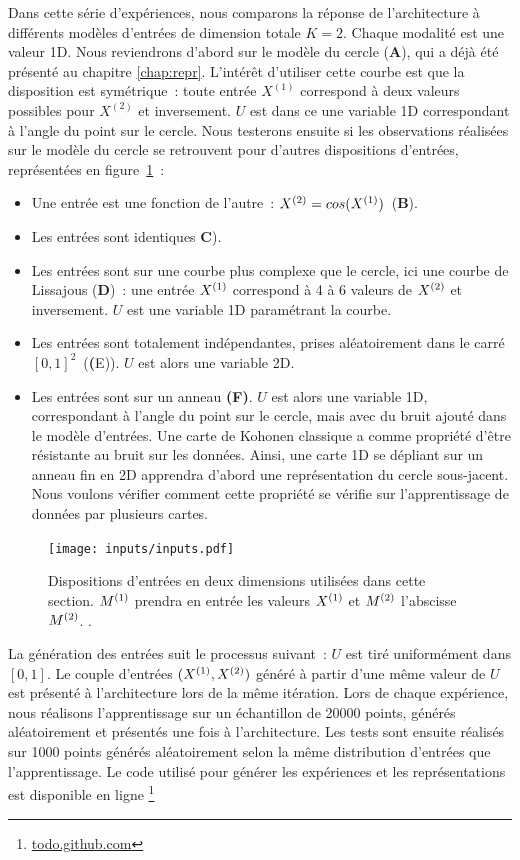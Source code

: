 \documentclass[../main]{subfiles}
\begin{document}
Dans cette série d'expériences, nous comparons la réponse de l'architecture à différents modèles d'entrées de dimension totale $K=2$. Chaque modalité est une valeur 1D.
Nous reviendrons d'abord sur le modèle du cercle (\textbf{A}), qui a déjà été présenté au chapitre \ref{chap:repr}. L'intérêt d'utiliser cette courbe est que la disposition est symétrique~: toute entrée $X^{(1)}$ correspond à deux valeurs possibles pour $X^{(2)}$ et inversement. $U$ est dans ce une variable 1D correspondant à l'angle du point sur le cercle.
Nous testerons ensuite si les observations réalisées sur le modèle du cercle se retrouvent pour d'autres dispositions d'entrées, représentées en figure~\ref{fig:input_list}~:
\begin{itemize}
	\item Une entrée est une fonction de l'autre~: $X^{({2})} = cos(X^{({1})})$~(\textbf{B}).
	\item Les entrées sont identiques \textbf{C}).
	\item Les entrées sont sur une courbe plus complexe que le cercle, ici une courbe de Lissajous (\textbf{D})~: une entrée $X^{({1})}$ correspond à 4 à 6 valeurs de $X^{({2})}$ et inversement. $U$ est une variable 1D paramétrant la courbe.
	\item Les entrées sont totalement indépendantes, prises aléatoirement dans le carré $[0,1]^2$~(\textbf({E})). $U$ est alors une variable 2D.
	\item Les entrées sont sur un anneau \textbf{(F)}. $U$ est alors une variable 1D, correspondant à l'angle du point sur le cercle, mais avec du bruit ajouté dans le modèle d'entrées. 
	Une carte de Kohonen classique a comme propriété d'être résistante au bruit sur les données. Ainsi, une carte 1D se dépliant sur un anneau fin en 2D apprendra d'abord une représentation du cercle sous-jacent. Nous voulons vérifier comment cette propriété se vérifie sur l'apprentissage de données par plusieurs cartes.
\end{itemize}

\begin{figure}[h!]
	\texttt{[image: inputs/inputs.pdf]}
	\caption{Dispositions d'entrées en deux dimensions utilisées dans cette section. $M^{({1})}$ prendra en entrée les valeurs $X^{({1})}$ et $M^{({2})}$ l'abscisse $M^{({2})}$. \label{fig:input_list}.}
\end{figure}

La génération des entrées suit le processus suivant~: $U$ est tiré uniformément dans $[0,1]$. Le couple d'entrées $(X^{({1})},X^{({2})})$ généré à partir d'une même valeur de $U$ est présenté à l'architecture lors de la même itération.
Lors de chaque expérience, nous réalisons l'apprentissage sur un échantillon de 20000 points, générés aléatoirement et présentés une fois à l'architecture. 
Les tests sont ensuite réalisés sur 1000 points générés aléatoirement selon la même distribution d'entrées que l'apprentissage.
Le code utilisé pour générer les expériences et les représentations est disponible en ligne \footnote{\url{todo.github.com}}
\end{document}
